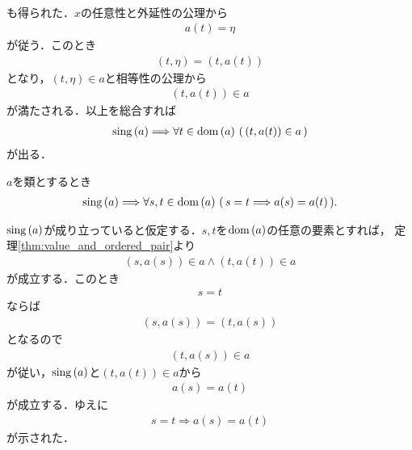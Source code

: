\begin{sketch}
\begin{align}
		\end{align}
		も得られた．$x$の任意性と外延性の公理から
		\begin{align}
			a(t) = \eta
		\end{align}
		が従う．このとき
		\begin{align}
			(t,\eta) = (t,a(t))
		\end{align}
		となり，$(t,\eta) \in a$と相等性の公理から
		\begin{align}
			(t,a(t)) \in a
		\end{align}
		が満たされる．以上を総合すれば
		\begin{align}
			\operatorname*{sing} \left(a\right) \Longrightarrow \forall t \in \operatorname*{dom} \left(a\right)\, \left(\, (t,a(t)) \in a\, \right)
		\end{align}
		が出る．
		\QED
	\end{sketch}
	
	\begin{screen}
		\begin{thm}
		\label{thm:uniqueness_of_values}
			$a$を類とするとき
			\begin{align}
				\operatorname*{sing} \left(a\right) \Longrightarrow
				\forall s,t \in \operatorname*{dom} \left(a\right)\, (\, s=t \Longrightarrow a(s) = a(t)\, ).
			\end{align}
		\end{thm}
	\end{screen}
	
	\begin{sketch}%
		$\operatorname*{sing} \left(a\right)$が成り立っていると仮定する．$s,t$を$\operatorname*{dom} \left(a\right)$の任意の要素とすれば，
		定理\ref{thm:value_and_ordered_pair}より
		\begin{align}
			(s,a(s)) \in a \wedge (t,a(t)) \in a
		\end{align}
		が成立する．このとき
		\begin{align}
			s = t
		\end{align}
		ならば
		\begin{align}
			(s,a(s)) = (t,a(s))
		\end{align}
		となるので
		\begin{align}
			(t,a(s)) \in a
		\end{align}
		が従い，$\operatorname*{sing} \left(a\right)$と$(t,a(t)) \in a$から
		\begin{align}
			a(s) = a(t)
		\end{align}
		が成立する．ゆえに
		\begin{align}
			s=t \Longrightarrow a(s) = a(t)
		\end{align}
		が示された．
		\QED
	\end{sketch}
	
